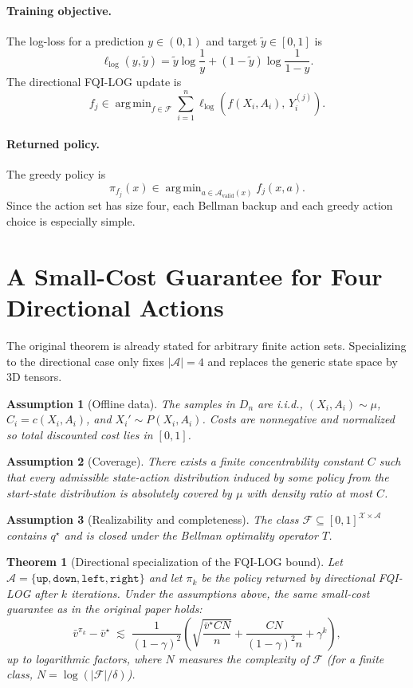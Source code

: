 \documentclass[11pt]{article}
\newtheorem{theorem}{Theorem}
\newtheorem{assumption}{Assumption}
\newcommand{\A}{\mathcal{A}}
\newcommand{\F}{\mathcal{F}}
\newcommand{\X}{\mathcal{X}}
\newcommand{\argmin}{\mathop{\mathrm{arg\,min}}}
\newcommand{\up}{\texttt{up}}
\newcommand{\downa}{\texttt{down}}
\newcommand{\lefta}{\texttt{left}}
\newcommand{\righta}{\texttt{right}}
\begin{document}
\paragraph{Training objective.}
The log-loss for a prediction $y \in (0,1)$ and target $\tilde y \in [0,1]$ is
\[
\ell_{\log}(y,\tilde y) = \tilde y \log\frac{1}{y} + (1-\tilde y)\log\frac{1}{1-y}.
\]
The directional FQI-LOG update is
\[
f_j \in \argmin_{f \in \F} \sum_{i=1}^n \ell_{\log}\!\left(f(X_i, A_i),\, Y_i^{(j)}\right).
\]

\paragraph{Returned policy.}
The greedy policy is
\[
\pi_{f_j}(x) \in \argmin_{a \in \A_{\mathrm{valid}}(x)} f_j(x,a).
\]
Since the action set has size four, each Bellman backup and each greedy action choice is especially simple.

\section{A Small-Cost Guarantee for Four Directional Actions}
The original theorem is already stated for arbitrary finite action sets. Specializing to the directional case only fixes $|\A|=4$ and replaces the generic state space by 3D tensors.

\begin{assumption}[Offline data]
The samples in $D_n$ are i.i.d., $(X_i,A_i) \sim \mu$, $C_i = c(X_i,A_i)$, and $X_i' \sim P(X_i,A_i)$. Costs are nonnegative and normalized so total discounted cost lies in $[0,1]$.
\end{assumption}

\begin{assumption}[Coverage]
There exists a finite concentrability constant $C$ such that every admissible state-action distribution induced by some policy from the start-state distribution is absolutely covered by $\mu$ with density ratio at most $C$.
\end{assumption}

\begin{assumption}[Realizability and completeness]
The class $\F \subseteq [0,1]^{\X \times \A}$ contains $q^\star$ and is closed under the Bellman optimality operator $T$.
\end{assumption}

\begin{theorem}[Directional specialization of the FQI-LOG bound]
Let $\A = \{\up,\downa,\lefta,\righta\}$ and let $\pi_k$ be the policy returned by directional FQI-LOG after $k$ iterations. Under the assumptions above, the same small-cost guarantee as in the original paper holds:
\[
\bar v^{\pi_k} - \bar v^\star
\;\lesssim\;
\frac{1}{(1-\gamma)^2}
\left(
\sqrt{\frac{\bar v^\star C N}{n}}
+
\frac{C N}{(1-\gamma)^2 n}
+
\gamma^k
\right),
\]
up to logarithmic factors, where $N$ measures the complexity of $\F$ (for a finite class, $N = \log(|\F|/\delta)$).
\end{theorem}
\end{document}
